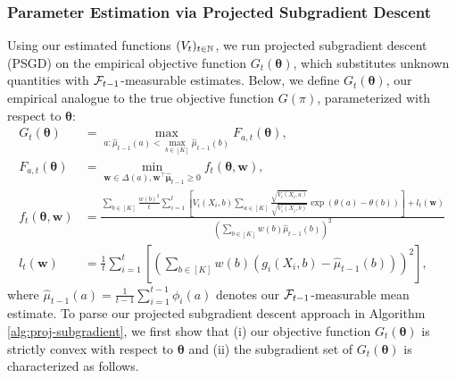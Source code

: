 \documentclass{article}
\begin{document}
\subsubsection{Parameter Estimation via Projected Subgradient Descent}

Using our estimated functions $(V_t)_{t\in \mathbb{N}}$, we run projected subgradient descent (PSGD) on the empirical objective function $G_t(\bm{\theta})$, which substitutes unknown quantities with $\mathcal{F}_{t-1}$-measurable estimates. Below, we define $G_t(\bm{\theta})$, our empirical analogue to the true objective function $G(\pi)$, parameterized with respect to $\bm{\theta}$:
\begin{align}\label{eqs:empirical_counterpart}
    G_t(\bm{\theta}) &=  \max_{a: \hat\mu_{t-1}(a) < \max_{b \in [K]} \hat\mu_{t-1}(b)} F_{a,t}(\bm\theta), \\
    F_{a,t}(\bm\theta) &= \min_{\bm{w} \in \Delta(a), \bm{w}^\top \hat{\bm\mu}_{t-1} \geq 0} f_{t}(\bm{\theta}, \bm{w}), \\
    f_{t}(\bm\theta, \bm{w}) &= \frac{ \sum_{b \in [K]} \frac{w(b)^2}{t} \sum_{i=1}^t\left[V_i(X_i,b)\sum_{a \in [K]}\frac{ \sqrt{V_i(X_i,a) } }{\sqrt{V_i(X_i,b) } }\exp\left(\theta(a) - \theta(b)\right)\right] + l_t(\bm{w})}{\left(\sum_{b \in [K]} w(b)  \hat\mu_{t-1}(b) \right)^2} \\
    l_t(\bm{w}) &= \frac{1}{t}\sum_{i=1}^t\left[ \left(\sum_{b \in [K]} w(b) (g_i(X_i,b)- \hat\mu_{t-1}(b)) \right)^2 \right], \label{eqs:empirical_counterpart_2}
\end{align}
where $\hat\mu_{t-1}(a) = \frac{1}{t-1}\sum_{i=1}^{t-1} \phi_i(a)$ denotes our $\mathcal{F}_{t-1}$-measurable mean estimate. To parse our projected subgradient descent approach in Algorithm \ref{alg:proj-subgradient}, we first show that (i) our objective function $G_t(\bm{\theta})$ is strictly convex with respect to $\bm{\theta}$ and (ii) the subgradient set of $G_t(\bm{\theta})$ is characterized as follows.
\end{document}
